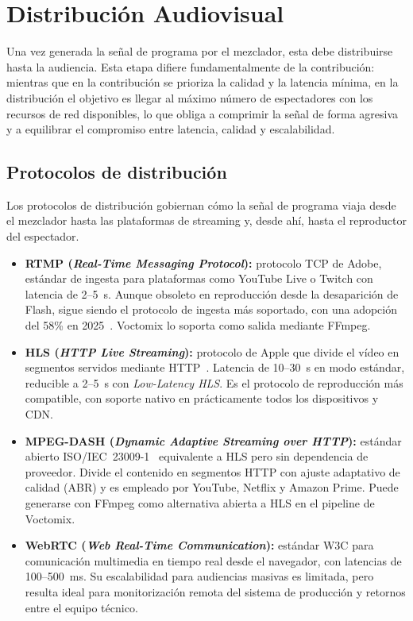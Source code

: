\section{Distribución Audiovisual}
\label{sec:distribucion_av}

Una vez generada la señal de programa por el mezclador, esta debe distribuirse hasta
la audiencia. Esta etapa difiere fundamentalmente de la contribución: mientras que en
la contribución se prioriza la calidad y la latencia mínima, en la distribución el
objetivo es llegar al máximo número de espectadores con los recursos de red disponibles,
lo que obliga a comprimir la señal de forma agresiva y a equilibrar el compromiso entre
latencia, calidad y escalabilidad.

\subsection{Protocolos de distribución}

Los protocolos de distribución gobiernan cómo la señal de programa viaja desde el
mezclador hasta las plataformas de streaming y, desde ahí, hasta el reproductor del
espectador.

\begin{itemize}
  \item \textbf{RTMP (\textit{Real-Time Messaging Protocol}):} protocolo TCP de Adobe,
  estándar de ingesta para plataformas como YouTube Live o Twitch con latencia de
  2--5~s. Aunque obsoleto en reproducción desde la desaparición de Flash, sigue siendo
  el protocolo de ingesta más soportado, con una adopción del 58\% en
  2025~\cite{haivision_broadcast_report_2025}. Voctomix lo soporta como salida mediante
  FFmpeg.

  \item \textbf{HLS (\textit{HTTP Live Streaming}):} protocolo de Apple que divide el
  vídeo en segmentos servidos mediante HTTP~\cite{rfc8216}. Latencia de 10--30~s en
  modo estándar, reducible a 2--5~s con \textit{Low-Latency HLS}. Es el protocolo de
  reproducción más compatible, con soporte nativo en prácticamente todos los dispositivos
  y CDN.

  \item \textbf{MPEG-DASH (\textit{Dynamic Adaptive Streaming over HTTP}):} estándar
  abierto ISO/IEC~23009-1~\cite{iso_mpegdash} equivalente a HLS pero sin dependencia de
  proveedor. Divide el contenido en segmentos HTTP con ajuste adaptativo de calidad
  (ABR) y es empleado por YouTube, Netflix y Amazon Prime. Puede generarse con FFmpeg
  como alternativa abierta a HLS en el pipeline de Voctomix.

  \item \textbf{WebRTC (\textit{Web Real-Time Communication}):} estándar W3C para
  comunicación multimedia en tiempo real desde el navegador, con latencias de
  100--500~ms. Su escalabilidad para audiencias masivas es limitada, pero resulta ideal
  para monitorización remota del sistema de producción y retornos entre el equipo técnico.
\end{itemize}

